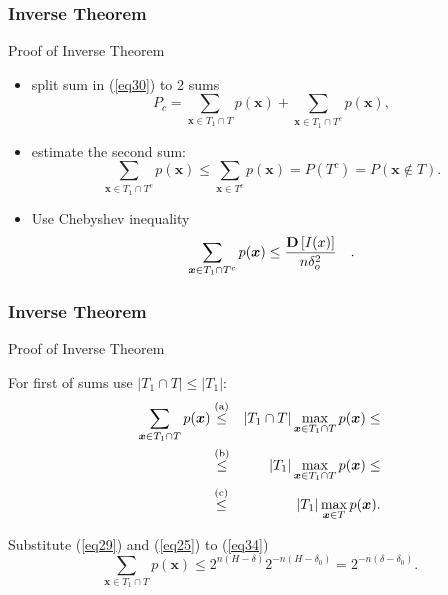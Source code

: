 \documentclass[14pt]{beamer}
\renewcommand{\vec}[1]{\ensuremath{\boldsymbol{#1}}}
\begin{document}
\begin{frame}
\frametitle{Inverse Theorem}
Proof of Inverse Theorem
\begin{itemize}
    
    \item split sum in (\ref{eq30}) to 2 sums
    \begin{equation}
    \label{eq32} P_c = \sum\limits_{\vec x \in T_1 \cap T} {p(\vec x)}
    + \sum\limits_{\vec x \in T_1 \cap T^c} {p(\vec x),}
    \end{equation}
    
    \item estimate the second sum:
    \[
    \sum\limits_{\vec x \in T_1 \cap T^c} {p(\vec x)} \le
    \sum\limits_{\vec x \in T^c} {p(\vec x) = } P(T^c) = P(\vec x
    \notin T).
    \]
    

    \item Use Chebyshev inequality
    \begin{equation}
    \label{eq33} \sum\limits_{\vec x \in T_1 \cap T^c} {p(\vec x)} \le
    \frac{{\rm {\bf D}}\left[ {I(x)} \right]}{n\delta _o^2 } \quad .
    \end{equation}

\end{itemize}
\end{frame}


\begin{frame}
\frametitle{Inverse Theorem}
Proof of Inverse Theorem
\begin{itemize}
\small{

    \item For first of sums use $\left| {T_1 \cap T} \right| \le \left| {T_1 }\right|$:
    \begin{eqnarray}
    \sum\limits_{\vec x \in T_1 \cap T} {p(\vec x)} %
    &\stackrel{\rm (a)}{\le} & \vert T_1 \cap T\vert \mathop {\max
    }\limits_{\vec x \in T_1 \cap T} p(\vec
    x) \le \nonumber \\
    &\stackrel{\rm (b)}{\le}&
     \vert T_1 \vert \mathop {\max }\limits_{\vec x \in T_1 \cap
    T} p(\vec x)\le \nonumber \\
    &\stackrel{\rm (c)}{\le}& \label{eq34}  \vert T_1 \vert \mathop
    {\max }\limits_{\vec x \in T} p(\vec x).
    \end{eqnarray}
    
    \item Substitute (\ref{eq29}) and (\ref{eq25}) to (\ref{eq34})
    \begin{equation}
    \label{eq35} \sum\limits_{\vec x \in T_1 \cap T} {p(\vec x)} \le
    2^{n(H - \delta )}2^{ - n(H - \delta _0 )} = 2^{ - n(\delta -
    \delta _0 )}.
    \end{equation}
}

\end{itemize}
\end{frame}
\end{document}
